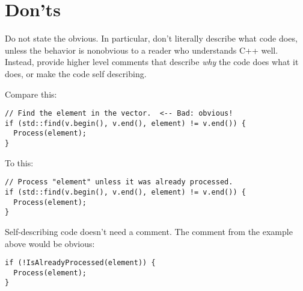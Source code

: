 
\section{Don'ts}\label{sec:don'ts}
Do not state the obvious. In particular, don't literally describe what code does, unless the behavior is nonobvious to a reader who understands C++ well. Instead, provide higher level comments that describe \emph{why} the code does what it does, or make the code self describing.

Compare this:
\begin{verbatim}
// Find the element in the vector.  <-- Bad: obvious!
if (std::find(v.begin(), v.end(), element) != v.end()) {
  Process(element);
}
\end{verbatim}
To this:
\begin{verbatim}
// Process "element" unless it was already processed.
if (std::find(v.begin(), v.end(), element) != v.end()) {
  Process(element);
}
\end{verbatim}
Self-describing code doesn't need a comment. The comment from the example above would be obvious:
\begin{verbatim}
if (!IsAlreadyProcessed(element)) {
  Process(element);
}
\end{verbatim}
